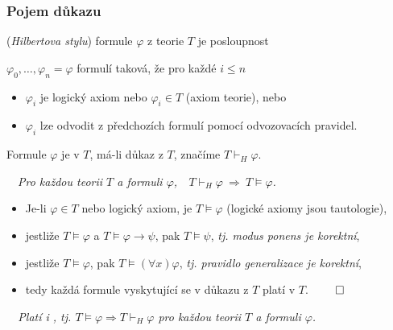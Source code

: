     \subsubsection*{Pojem důkazu}
     (\emph{Hilbertova stylu}) formule $\varphi$ z teorie $T$ je  posloupnost
    \smallskip
    
    $\varphi_0, \dots, \varphi_n=\varphi$ formulí taková, že pro každé $i\le n$
    \smallskip
    
    \begin{itemize}
    \item $\varphi_i$ je logický axiom nebo $\varphi_i \in T$ (axiom teorie), nebo
    \smallskip
    
    \item $\varphi_i$ lze odvodit z předchozích formulí pomocí odvozovacích pravidel.
    \end{itemize}
    \smallskip
    
    Formule $\varphi$ je  v $T$, má-li důkaz z $T$, značíme $T \vdash_{H} \varphi$.
    \bigskip
    
    {\bf {}}\ \ {\it  Pro každou teorii $T$ a formuli $\varphi$,\ \ $T\vdash_H \varphi\ \Rightarrow\ T\models \varphi$.}
    \medskip
    
    {\it {}}
    \begin{itemize}
    \item Je-li $\varphi\in T$ nebo logický axiom, je $T \models \varphi$ (logické axiomy jsou tautologie),
    \item jestliže $T \models \varphi$ a $T \models \varphi \to \psi$, pak $T \models \psi$, \emph{tj. modus ponens je korektní},
    \item jestliže $T \models \varphi$, pak $T \models (\forall x)\varphi$, \emph{tj. pravidlo generalizace je korektní},
    \item tedy každá formule vyskytující se v důkazu z $T$ platí v $T$. $\qed$
    \end{itemize}
    \medskip
    
    {\it {}\ \ Platí i , tj. $T\models \varphi \Rightarrow T\vdash_H \varphi$ pro každou teorii $T$ a formuli $\varphi$.}
